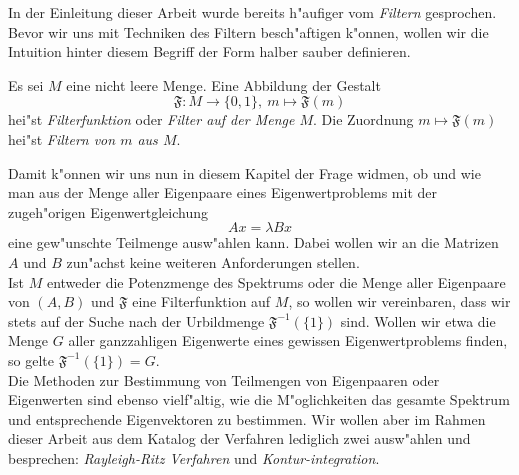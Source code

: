 In der Einleitung dieser Arbeit wurde bereits h"aufiger vom \emph{Filtern} gesprochen.
Bevor wir uns mit Techniken des Filtern besch"aftigen k"onnen, wollen wir die Intuition hinter diesem Begriff der Form halber sauber definieren.

\begin{defn}[Filter]
Es sei $M$ eine nicht leere Menge. Eine Abbildung der Gestalt
\[
\mathfrak{F}\colon M \to \{0,1\},\ %
m\mapsto\mathfrak{F}(m)
\]
hei"st \emph{Filterfunktion} oder \emph{Filter auf der Menge $M$}. Die Zuordnung $m\mapsto\mathfrak{F}(m)$ hei"st \emph{Filtern von $m$ aus $M$}.
\end{defn}

Damit k"onnen wir uns nun in diesem Kapitel der Frage widmen, ob und wie man aus der Menge aller Eigenpaare eines Eigenwertproblems mit der zugeh"origen Eigenwertgleichung
\[
Ax = \lambda Bx
\]
eine gew"unschte Teilmenge ausw"ahlen kann.
Dabei wollen wir an die Matrizen $A$ und $B$ zun"achst keine weiteren Anforderungen stellen.\\

Ist $M$ entweder die Potenzmenge des Spektrums oder die Menge aller Eigenpaare von $(A,B)$ und $\mathfrak{F}$ eine Filterfunktion auf $M$, so wollen wir vereinbaren, dass wir stets auf der Suche nach der Urbildmenge $\mathfrak{F}^{-1}(\{ 1\})$ sind.
Wollen wir etwa die Menge $G$ aller ganzzahligen Eigenwerte eines gewissen Eigenwertproblems finden, so gelte $\mathfrak{F}^{-1}(\{1\}) = G$.\\

Die Methoden zur Bestimmung von Teilmengen von Eigenpaaren oder Eigenwerten sind ebenso vielf"altig, wie die M"oglichkeiten das gesamte Spektrum und entsprechende Eigenvektoren zu bestimmen.
Wir wollen aber im Rahmen dieser Arbeit aus dem Katalog der Verfahren lediglich zwei ausw"ahlen und besprechen: \emph{Rayleigh-Ritz Verfahren} und \emph{Kontur-integration}.

\newpage


